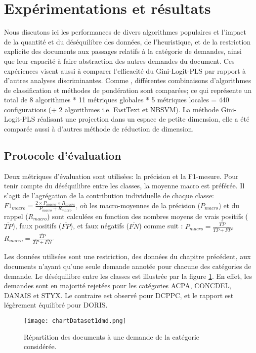 \section{Expérimentations et résultats}
\label{sec:sensresultat:experimentations}
Nous discutons ici les performances de divers algorithmes populaires et l'impact de la quantité et du déséquilibre des données, de l'heuristique, et de la restriction explicite des documents aux passages relatifs à la catégorie de demandes, ainsi que leur capacité à faire abstraction des autres demandes du document. {Ces expériences visent aussi à comparer l'efficacité du Gini-Logit-PLS par rapport à d'autres analyses discriminantes}.  Comme \citet{im2017textclasstermweighting}, différentes combinaisons d'algorithmes de classification et méthodes de pondération  sont comparées; ce qui représente un total de 8 algorithmes * 11 métriques globales * 5 métriques locales = 440 configurations (+ 2 algorithmes i.e. FastText et NBSVM). La méthode Gini-Logit-PLS réalisant une projection dans un espace de petite dimension, elle a été comparée aussi à d'autres méthode de réduction de dimension.

\subsection{Protocole d'évaluation}
Deux métriques d'évaluation sont utilisées: la précision et la F1-mesure. Pour tenir compte du déséquilibre entre les classes, la moyenne macro est préférée. Il s'agit de l'agrégation de la contribution individuelle de chaque classe: $F1_{macro} = \frac{2 \times P_{macro} \times R_{macro}}{P_{macro} + R_{macro}}$, où les macro-moyennes de la précision ($P_{macro}$) et du rappel ($R_{macro}$) sont calculées en fonction des nombres moyens de vrais positifs ($\overline{TP}$), faux positifs ($\overline{FP}$), et faux négatifs ($\overline{FN}$) comme suit \citep{van2013macromicroeval}:
$P_{macro} = \frac{\overline{TP}}{\overline{TP} + \overline{FP}}$, $R_{macro} = \frac{\overline{TP}}{\overline{TP} + \overline{FN}}$.


Les données utilisées sont une restriction, des données du chapitre précédent, aux documents n'ayant qu'une seule demande annotée pour chacune des catégories de demande. Le déséquilibre entre les classes est illustrée par la figure \ref{fig:sensresultat:stat-1dmd}. En effet, les demandes sont en majorité rejetées pour les catégories ACPA, CONCDEL, DANAIS et STYX. Le contraire est observé pour DCPPC, et le rapport est légèrement équilibré pour DORIS.
\begin{figure}[htb]
\texttt{[image: chartDataset1dmd.png]}
\caption{Répartition des documents à une demande de la catégorie considérée.}\label{fig:sensresultat:stat-1dmd}
\end{figure}

